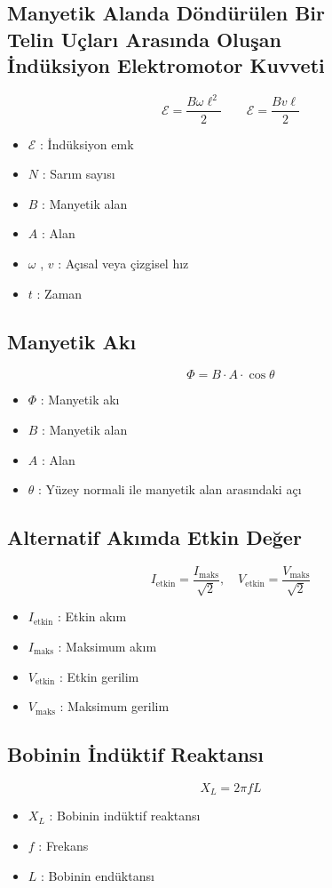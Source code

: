 \documentclass[a4paper, 11pt, titlepage]{article}
\begin{document}
\subsection[Döndürülen Telde İndüksiyon EMK]{Manyetik Alanda Döndürülen Bir \\Telin Uçları Arasında Oluşan \\İndüksiyon Elektromotor Kuvveti}
\[
\mathcal{E} = \frac{B\omega\ell^2}{2} \qquad \mathcal{E} = \frac{Bv\ell}{2}
\]
\begin{itemize}
  \item $\mathcal{E}$ : İndüksiyon emk
  \item $N$ : Sarım sayısı
  \item $B$ : Manyetik alan
  \item $A$ : Alan
  \item $\omega$ , $v$ : Açısal veya çizgisel hız
  \item $t$ : Zaman
\end{itemize}

\subsection{Manyetik Akı}
\[
\Phi = B \cdot A \cdot \cos \theta
\]
\begin{itemize}
  \item $\Phi$ : Manyetik akı
  \item $B$ : Manyetik alan
  \item $A$ : Alan
  \item $\theta$ : Yüzey normali ile manyetik alan arasındaki açı
\end{itemize}

\subsection{Alternatif Akımda Etkin Değer}
\[
I_{\mathrm{etkin}} = \frac{I_{\mathrm{maks}}}{\sqrt{2}}, \quad V_{\mathrm{etkin}} = \frac{V_{\mathrm{maks}}}{\sqrt{2}}
\]
\begin{itemize}
  \item $I_{\mathrm{etkin}}$ : Etkin akım
  \item $I_{\mathrm{maks}}$ : Maksimum akım
  \item $V_{\mathrm{etkin}}$ : Etkin gerilim
  \item $V_{\mathrm{maks}}$ : Maksimum gerilim
\end{itemize}

\subsection{Bobinin İndüktif Reaktansı}
\[
X_L = 2 \pi f L
\]
\begin{itemize}
  \item $X_L$ : Bobinin indüktif reaktansı
  \item $f$ : Frekans
  \item $L$ : Bobinin endüktansı
\end{itemize}
\end{document}
